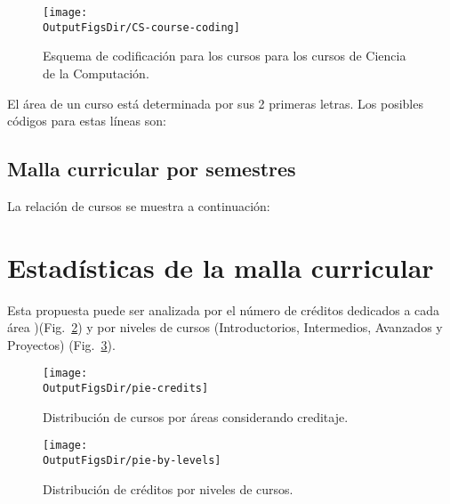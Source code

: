 \begin{figure}[ht]
   \centering
      \texttt{[image: \\OutputFigsDir/CS-course-coding]} 
   \caption{Esquema de codificación para los cursos para los cursos de Ciencia de la Computación.}
   \label{fig:cs-course-number}
\end{figure}

El área de un curso está determinada por sus 2 primeras letras. Los posibles códigos para estas lí­neas son:
% 

\begin{landscape}
\section{Malla curricular por semestres}\label{sec:courses-by-semester}
La relación de cursos se muestra a continuación:
%

\end{landscape}

\section{Estadí­sticas de la malla curricular}
Esta propuesta puede ser analizada por el número de créditos dedicados a cada área )(Fig.~\ref{fig:pie-credits}) %
y por niveles de cursos (Introductorios, Intermedios, Avanzados y Proyectos) (Fig.~\ref{fig:pie-by-levels}).

\vspace{0.5cm}
\begin{figure}[h!]
      \centering
      \texttt{[image: \\OutputFigsDir/pie-credits]}
      \label{fig:pie-credits}
      \caption{Distribución de cursos por áreas considerando creditaje.}
\end{figure}

\begin{figure}[h!]
      \centering
      \texttt{[image: \\OutputFigsDir/pie-by-levels]}
      \label{fig:pie-by-levels}
      \caption{Distribución de créditos por niveles de cursos.}
\end{figure}

